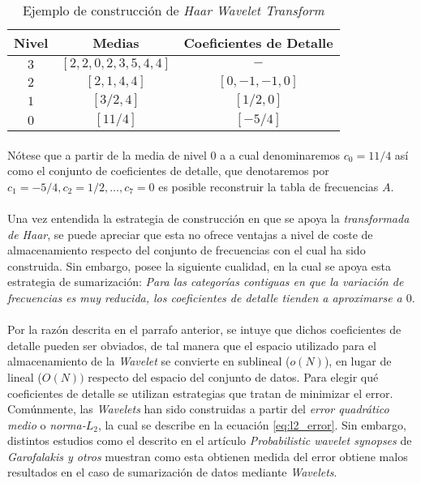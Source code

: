 \documentclass{subfiles}
\begin{document}
          \begin{table}[H]
            \centering
            \begin{tabular}{| c | c | c |}
              \hline
              Nivel & Medias & Coeficientes de Detalle  \\ \hline \hline
              $3$ & $[2,2,0,2,3,5,4,4]$ & $-$         \\ \hline
              $2$ & $[2,1,4,4]$         & $[0,-1,-1,0]$ \\ \hline
              $1$ & $[3/2,4]$           & $[1/2, 0]$    \\ \hline
              $0$ & $[11/4]$            & $[-5/4]$      \\
              \hline
            \end{tabular}
            \caption{Ejemplo de construcción de \emph{Haar Wavelet Transform}}
            \label{table:wavelet_example}
          \end{table}

          \paragraph{}
          Nótese que a partir de la media de nivel 0 a a cual denominaremos $c_0 = 11/4$ así como el conjunto de coeficientes de detalle, que denotaremos por $c_1 = -5/4, c_2 = 1/2, ..., c_7 = 0$ es posible reconstruir la tabla de frecuencias $A$.

        \paragraph{}
        Una vez entendida la estrategia de construcción en que se apoya la \emph{transformada de Haar}, se puede apreciar que esta no ofrece ventajas a nivel de coste de almacenamiento respecto del conjunto de frecuencias con el cual ha sido construida. Sin embargo, posee la siguiente cualidad, en la cual se apoya esta estrategia de sumarización: \emph{Para las categorías contiguas en que la variación de frecuencias es muy reducida, los coeficientes de detalle tienden a aproximarse a $0$}.

        \paragraph{}
        Por la razón descrita en el parrafo anterior, se intuye que dichos coeficientes de detalle pueden ser obviados, de tal manera que el espacio utilizado para el almacenamiento de la \emph{Wavelet} se convierte en sublineal ($o(N)$), en lugar de lineal ($O(N))$ respecto del espacio del conjunto de datos. Para elegir qué coeficientes de detalle se utilizan estrategias que tratan de minimizar el error. Comúnmente, las \emph{Wavelets} han sido construidas a partir del \emph{error quadrático medio} o \emph{norma-$L_2$}, la cual se describe en la ecuación \eqref{eq:l2_error}. Sin embargo, distintos estudios como el descrito en el artículo \emph{Probabilistic wavelet synopses} \cite{garofalakis2004probabilistic} de \emph{Garofalakis y otros} muestran como esta obtienen medida del error obtiene malos resultados en el caso de sumarización de datos mediante \emph{Wavelets}.
\end{document}
